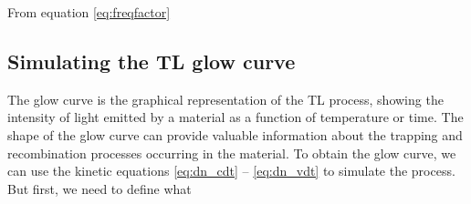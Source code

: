 From equation \ref{eq:freqfactor}


\subsection{Simulating the TL glow curve} \label{sec:simulacioncurva}

The glow curve is the graphical representation of the TL process, showing the intensity of light emitted by a material as a function of temperature or time. The shape of the glow curve can provide valuable information about the trapping and recombination processes occurring in the material. To obtain the glow curve, we can use the kinetic equations \ref{eq:dn_cdt} -- \ref{eq:dn_vdt} to simulate the process. But first, we need to define what 